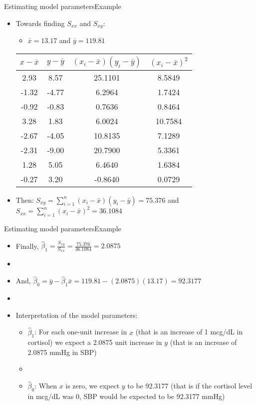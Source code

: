 \documentclass[xcolor=dvipsnames]{beamer}
\begin{document}
\begin{frame}{Estimating model parameters}{Example}
\begin{itemize}
	\item Towards finding $S_{xx}$ and $S_{xy}$:
	\begin{itemize}
		\item $\bar{x} = 13.17$ and $\bar{y} = 119.81$
	\end{itemize}
	\vspace{1mm}
	\begin{center}
		\begin{tabular}{cccc}
			\hline
		 $x-\bar{x}$ & $y-\bar{y}$ & $(x_i - \bar{x})(y_i - \bar{y})$ & $\left(x_i - \bar{x}\right)^2$ \\ 
			\hline
			 2.93 &  8.57& 25.1101 & 8.5849\\ 
			 -1.32 &  -4.77 & 6.2964 & 1.7424\\ 
			 -0.92 & -0.83 & 0.7636 & 0.8464 \\ 
			 3.28 &  1.83 & 6.0024 & 10.7584\\ 
			 -2.67 &  -4.05 & 10.8135 & 7.1289\\ 
			 -2.31 &  -9.00 & 20.7900 & 5.3361\\ 
			 1.28 &  5.05 & 6.4640 & 1.6384\\ 
			 -0.27 &  3.20 & -0.8640 & 0.0729\\ 
			\hline
		\end{tabular}
	\end{center}
		\vspace{1mm}
		\item Then: $S_{xy} = \sum_{i=1}^{n}(x_i - \bar{x})(y_i - \bar{y}) = 75.376$ and $S_{xx} = \sum_{i=1}^{n}\left(x_i - \bar{x}\right)^2 = 36.1084$
\end{itemize}
\end{frame}

\begin{frame}{Estimating model parameters}{Example}
	\begin{itemize}
		\item Finally, $\hat{\beta}_1 = \frac{S_{xy}}{S_{xx}} =  \frac{75.376}{36.1084}  = 2.0875$
		\item[]
		\item And, $\hat{\beta}_0 = \bar{y} - \hat{\beta}_1 \bar{x} = 119.81 - (2.0875)(13.17) = 92.3177 $
		\item[]
		\item Interpretation of the model parameters:
		\begin{itemize}
			\item $\hat{\beta}_1$: For each one-unit increase in $x$ (that is an increase of 1 mcg/dL in cortisol) we expect a 2.0875 unit increase in $y$ (that is an increase of 2.0875 mmHg in SBP)
			\item[]
			\item $\hat{\beta}_0$: When $x$ is zero, we expect $y$ to be 92.3177 (that is if the cortisol level in mcg/dL was 0, SBP would be expected to be 92.3177 mmHg)
		\end{itemize}
	\end{itemize}
\end{frame}
\end{document}
